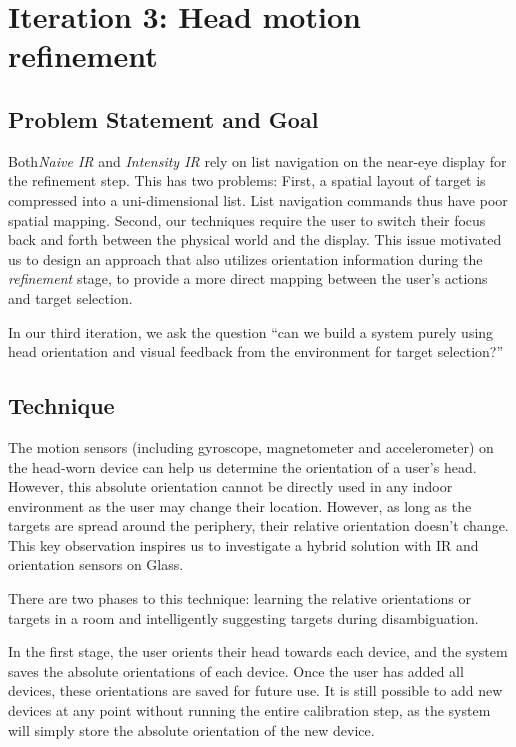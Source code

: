 \section{Iteration 3: Head motion refinement}
\label{sec:iteration-3:-head}
\subsection{Problem Statement and Goal}
Both{\em Naive IR} and {\em Intensity IR} rely on list navigation on the near-eye display for the refinement step. This has two problems: First, a spatial layout of target is compressed into a uni-dimensional list. List navigation commands thus have poor spatial mapping. Second, our techniques require the user to switch their focus back and forth between the physical world and the display. This issue motivated us to design an approach that also utilizes orientation information during the {\em refinement} stage, to provide a more direct mapping between the user's actions and target selection.

In our third iteration, we ask the question ``can we build a system purely using head orientation and visual feedback from the environment for target selection?''

\subsection{Technique}
The motion sensors (including gyroscope, magnetometer and accelerometer) on the head-worn device can help us determine the orientation of a user's head. However, this absolute orientation cannot be directly used in any indoor environment as the user may change their location. However, as long as the targets are spread around the periphery, their relative orientation doesn't change. This key observation inspires us to investigate a hybrid solution with IR and orientation sensors on Glass.

There are two phases to this technique: learning the relative orientations or targets in a room and intelligently suggesting targets during disambiguation.

In the first stage, the user orients their head towards each device, and the system saves the absolute orientations of each device. Once the user has added all devices, these orientations are saved for future use. It is still possible to add new devices at any point without running the entire calibration step, as the system will simply store the absolute orientation of the new device.

